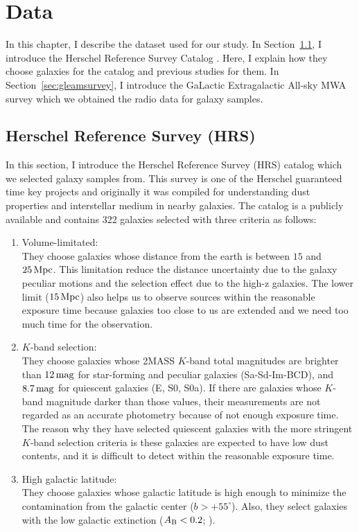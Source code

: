 \chapter{Data}\label{chap:data}
\begin{chapabstract}

In this chapter, I describe the dataset used for our study.
In Section~\ref{sec:HerschelReferenceSurvey}, I introduce the Herschel Reference Survey Catalog \citep{Boselli2010}.
Here, I explain how they choose galaxies for the catalog and previous studies for them.
In Section~\ref{sec:gleamsurvey}, I introduce the GaLactic Extragalactic All-sky MWA survey which we obtained the radio data for galaxy samples.

\end{chapabstract}

\section{Herschel Reference Survey (HRS)}\label{sec:HerschelReferenceSurvey}
In this section, I introduce the Herschel Reference Survey (HRS) catalog \citep{Boselli2010} which we selected galaxy samples from.
This survey is one of the Herschel guaranteed time key projects and originally it was compiled for understanding dust properties and interstellar medium in nearby galaxies.
The catalog is a publicly available and contains 322 galaxies selected with three criteria as follows:

\begin{enumerate}
    \item Volume-limitated:\\
        They choose galaxies whose distance from the earth is between $15$ and $25\,\mathrm{Mpc}$.
        This limitation reduce the distance uncertainty due to the galaxy peculiar motions and the selection effect due to the high-z galaxies.
        The lower limit ($15\,\mathrm{Mpc}$) also helps us to observe sources within the reasonable exposure time because galaxies too close to us are extended and we need too much time for the observation.
    \item $K$-band selection:\\
        They choose galaxies whose 2MASS $K$-band total magnitudes are brighter than $12\,\mathrm{mag}$ for star-forming and peculiar galaxies (Sa-Sd-Im-BCD), and $8.7\,\mathrm{mag}$ for quiescent galaxies (E, S0, S0a).
        If there are galaxies whose $K$-band magnitude darker than those values, their measurements are not regarded as an accurate photometry because of not enough exposure time.
        The reason why they have selected quiescent galaxies with the more stringent $K$-band selection criteria is these galaxies are expected to have low dust contents, and it is difficult to detect within the reasonable exposure time.
    \item High galactic latitude:\\
        They choose galaxies whose galactic latitude is high enough to minimize the contamination from the galactic center ($b > +55^{\circ}$).
        Also, they select galaxies with the low galactic extinction ($A_{\mathrm{B}} < 0.2$; \citealt{Schlegel1998}).
\end{enumerate}


